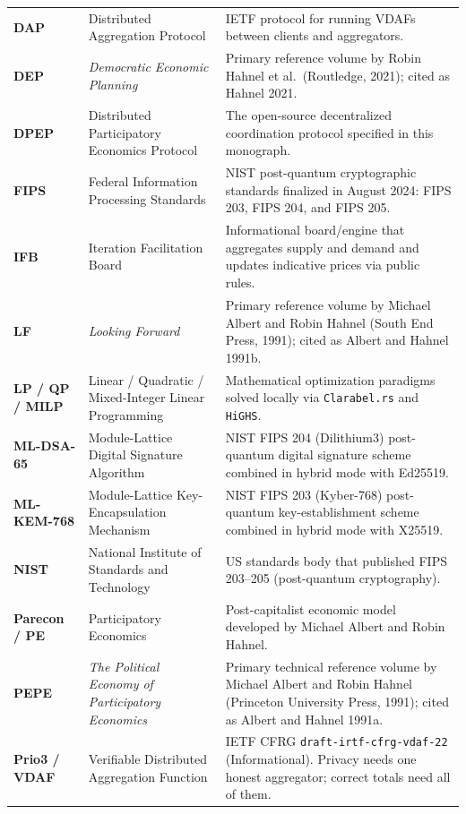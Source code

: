 \documentclass[10pt,twoside,openany]{book}
\theoremstyle{dpepstyle}
\begin{document}
{\begin{longtable}{L{0.92in} L{1.75in} L{1.95in}}
\textbf{DAP} & Distributed Aggregation Protocol & IETF protocol for running VDAFs between clients and aggregators. \\
\textbf{DEP} & \emph{Democratic Economic Planning} & Primary reference volume by Robin Hahnel et al.\ (Routledge, 2021); cited as Hahnel 2021. \\
\textbf{DPEP} & Distributed Participatory Economics Protocol & The open-source decentralized coordination protocol specified in this monograph. \\
\textbf{FIPS} & Federal Information Processing Standards & NIST post-quantum cryptographic standards finalized in August 2024: FIPS 203, FIPS 204, and FIPS 205. \\
\textbf{IFB} & Iteration Facilitation Board & Informational board/engine that aggregates supply and demand and updates indicative prices via public rules. \\
\textbf{LF} & \emph{Looking Forward} & Primary reference volume by Michael Albert and Robin Hahnel (South End Press, 1991); cited as Albert and Hahnel 1991b. \\
\textbf{LP / QP / MILP} & Linear / Quadratic / Mixed-Integer Linear Programming & Mathematical optimization paradigms solved locally via \texttt{Clarabel.rs} and \texttt{HiGHS}. \\
\textbf{ML-DSA-65} & Module-Lattice Digital Signature Algorithm & NIST FIPS 204 (Dilithium3) post-quantum digital signature scheme combined in hybrid mode with Ed25519. \\
\textbf{ML-KEM-768} & Module-Lattice Key-Encapsulation Mechanism & NIST FIPS 203 (Kyber-768) post-quantum key-establishment scheme combined in hybrid mode with X25519. \\
\textbf{NIST} & National Institute of Standards and Technology & US standards body that published FIPS 203--205 (post-quantum cryptography). \\
\textbf{Parecon / PE} & Participatory Economics & Post-capitalist economic model developed by Michael Albert and Robin Hahnel. \\
\textbf{PEPE} & \emph{The Political Economy of Participatory Economics} & Primary technical reference volume by Michael Albert and Robin Hahnel (Princeton University Press, 1991); cited as Albert and Hahnel 1991a. \\
\textbf{Prio3 / VDAF} & Verifiable Distributed Aggregation Function & IETF CFRG \texttt{draft-irtf-cfrg-vdaf-22} (Informational). Privacy needs one honest aggregator; correct totals need all of them. \\

\end{longtable}}
\end{document}
